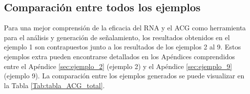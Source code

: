 \subsection{Comparación entre todos los ejemplos}
	\label{sec:comparacion}
	
	Para una mejor comprensión de la eficacia del RNA y el ACG como herramienta para el análisis y generación de señalamiento, los resultados obtenidos en el ejemplo 1 son contrapuestos junto a los resultados de los ejemplos 2 al 9. Estos ejemplos extra pueden encontrarse detallados en los Apéndices comprendidos entre el Apéndice \ref{sec:ejemplo_2} (ejemplo 2) y el Apéndice \ref{sec:ejemplo_9} (ejemplo 9). La comparación entre los ejemplos generados se puede visualizar en la Tabla \ref{Tab:tabla_ACG_total}.

	\begin{table}[H]
		{
			\caption{Comparación entre los ejemplos generados por el ACG.}
			\label{Tab:tabla_ACG_total}
			\centering
			\begin{center}
\end{center}}
\end{table}
